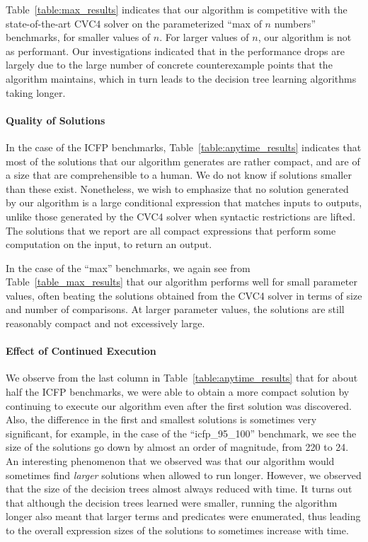 \documentclass{llncs}
\begin{document}
Table~\ref{table:max_results} indicates that our algorithm is competitive
with the state-of-the-art CVC4 solver on the parameterized ``max of
$n$ numbers'' benchmarks, for smaller values of $n$. For larger
values of $n$, our algorithm is not as performant. Our investigations
indicated that in the performance drops are largely due to the large
number of concrete counterexample points that the algorithm maintains,
which in turn leads to the decision tree learning algorithms taking
longer.

\paragraph{Quality of Solutions}
In the case of the ICFP benchmarks, Table~\ref{table:anytime_results}
indicates that most of the solutions that our algorithm generates are
rather compact, and are of a size that are comprehensible to a
human. We do not know if solutions smaller than these
exist. Nonetheless, we wish to emphasize that no solution generated by
our algorithm is a large conditional expression that matches inputs to
outputs, unlike those generated by the CVC4 solver when syntactic
restrictions are lifted. The solutions that we report are all compact
expressions that perform some computation on the input, to return an
output.

In the case of the ``max'' benchmarks, we again see from
Table~\ref{table_max_results} that our algorithm performs well for
small parameter values, often beating the solutions obtained from the
CVC4 solver in terms of size and number of comparisons. At larger
parameter values, the solutions are still reasonably compact and not
excessively large.

\paragraph{Effect of Continued Execution}
We observe from the last column in Table~\ref{table:anytime_results}
that for about half the ICFP benchmarks, we were able to obtain a more
compact solution by continuing to execute our algorithm even after the
first solution was discovered. Also, the difference in the first and
smallest solutions is sometimes very significant, for example, in the
case of the ``icfp\_95\_100'' benchmark, we see the size of the
solutions go down by almost an order of magnitude, from 220 to 24. An
interesting phenomenon that we observed was that our algorithm would
sometimes find \emph{larger} solutions when allowed to run
longer. However, we observed that the size of the decision trees
almost always reduced with time. It turns out that although the
decision trees learned were smaller, running the algorithm longer also
meant that larger terms and predicates were enumerated, thus leading
to the overall expression sizes of the solutions to sometimes increase
with time.
\end{document}
